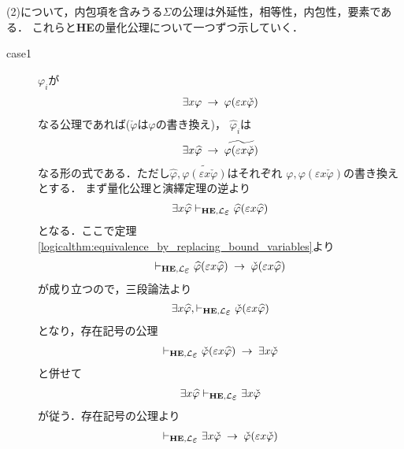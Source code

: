 \begin{metaprf}
		(2)について，内包項を含みうる$\Sigma$の公理は外延性，相等性，内包性，要素である．
		これらと{\bf HE}の量化公理について一つずつ示していく．
		\begin{description}
			\item[case1] $\varphi_{i}$が
				\begin{align}
					\exists x \varphi \hspace{0.25em}\rightarrow\hspace{0.25em} \varphi(\varepsilon x \check{\varphi})
				\end{align}
				なる公理であれば($\check{\varphi}$は$\varphi$の書き換え)，
				$\widehat{\varphi}_{i}$は
				\begin{align}
					\exists x \widehat{\varphi} \hspace{0.25em}\rightarrow\hspace{0.25em} 
					\widetilde{\varphi(\varepsilon x \check{\varphi})}
				\end{align}
				なる形の式である．ただし$\widehat{\varphi},
				\widetilde{\varphi(\varepsilon x \check{\varphi})}$はそれぞれ
				$\varphi,\varphi(\varepsilon x \check{\varphi})$の書き換えとする．
				まず量化公理と演繹定理の逆より
				\begin{align}
					\exists x \widehat{\varphi} \provable{\mbox{{\bf HE}},\lang{\varepsilon}} \widehat{\varphi}(\varepsilon x \widehat{\varphi})
				\end{align}
				となる．ここで定理\ref{logicalthm:equivalence_by_replacing_bound_variables}より
				\begin{align}
					\provable{\mbox{{\bf HE}},\lang{\varepsilon}} \widehat{\varphi}(\varepsilon x \widehat{\varphi}) \rarrow \check{\varphi}(\varepsilon x \widehat{\varphi})
				\end{align}
				が成り立つので，三段論法より
				\begin{align}
					\exists x \widehat{\varphi}, \provable{\mbox{{\bf HE}},\lang{\varepsilon}} \check{\varphi}(\varepsilon x \widehat{\varphi})
				\end{align}
				となり，存在記号の公理
				\begin{align}
					\provable{\mbox{{\bf HE}},\lang{\varepsilon}} \check{\varphi}(\varepsilon x \widehat{\varphi}) \rarrow \exists x \check{\varphi}
				\end{align}
				と併せて
				\begin{align}
					\exists x \widehat{\varphi} \provable{\mbox{{\bf HE}},\lang{\varepsilon}} \exists x \check{\varphi}
				\end{align}
				が従う．存在記号の公理より
				\begin{align}
					\provable{\mbox{{\bf HE}},\lang{\varepsilon}} \exists x \check{\varphi} \rarrow \check{\varphi}(\varepsilon x \check{\varphi})
				\end{align}

\end{description}
\end{metaprf}
